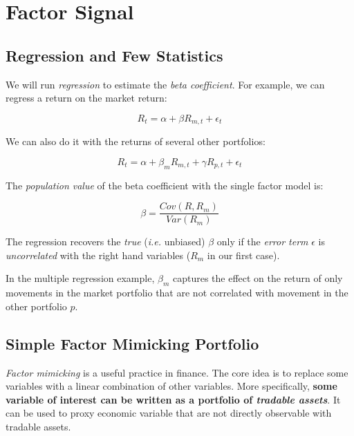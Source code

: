 \chapter{Factor Signal}

\section{Regression and Few Statistics}

We will run \textit{regression} to estimate the 
\textit{beta coefficient}. For example, we can 
regress a return on the market return:

\begin{equation}
    R_{t} = \alpha + \beta R_{m,t} + \epsilon_{t}
\end{equation}

We can also do it with the returns of several other portfolios:

\begin{equation}
    R_{t} = \alpha + \beta_m R_{m,t} + \gamma R_{p,t} + \epsilon_{t}
\end{equation}

The \textit{population value} of the beta coefficient with the single factor model is:

\begin{equation}
    \beta = \frac{Cov(R,R_m)}{Var(R_m)}
\end{equation}

The regression recovers the \textit{true} (\textit{i.e.} unbiased) 
$\beta$ only if the \textit{error term} $\epsilon$ is \textit{uncorrelated}
with the right hand variables ($R_m$ in our first case).

In the multiple regression example, 
$\beta_m$ captures the effect on the return of only movements in the market portfolio 
that are not correlated with movement in the other portfolio $p$.


\section{Simple Factor Mimicking Portfolio}

\textit{Factor mimicking} is a useful practice in finance. 
The core idea is to replace some variables with 
a linear combination of other variables. More
specifically, \textbf{some variable of interest can be
written as a portfolio of \textit{tradable assets}}.
It can be used to proxy economic variable that 
are not directly observable with tradable assets.

